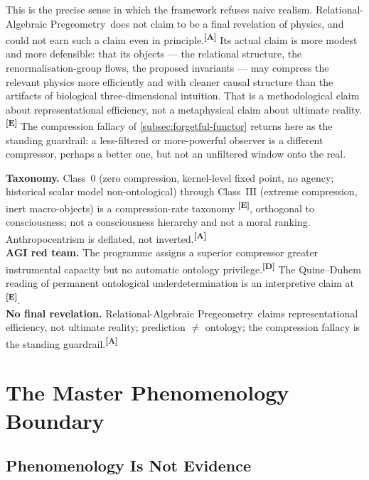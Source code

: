 \documentclass[12pt,a4paper,twoside]{article}
\theoremstyle{plain}
\theoremstyle{definition}
\theoremstyle{remark}
\newcommand{\ProjectShort}{Relational-Algebraic Pregeometry}
\newcommand{\RAP}{\ProjectShort}
\newcommand{\catmark}[1]{\textsuperscript{\textsf{\textbf{[#1]}}}}
\begin{document}
This is the precise sense in which the framework refuses naive realism.
\RAP\ does not claim to be a final revelation of physics, and could not
earn such a claim even in principle.\catmark{A} Its actual claim is more
modest and more defensible: that its objects --- the relational structure,
the renormalisation-group flows, the proposed invariants --- may compress
the relevant physics more efficiently and with cleaner causal structure
than the artifacts of biological three-dimensional intuition. That is a
methodological claim about representational efficiency, not a metaphysical
claim about ultimate reality.\catmark{E} The compression fallacy of
\cref{subsec:forgetful-functor} returns here as the standing guardrail: a
less-filtered or more-powerful observer is a different compressor, perhaps
a better one, but not an unfiltered window onto the real.

\begin{evidencebox}{}
\textbf{Taxonomy.} Class~0 (zero compression, kernel-level fixed point, no
agency; historical scalar model non-ontological) through Class~III (extreme compression, inert
macro-objects) is a compression-rate taxonomy \catmark{E}, orthogonal to
consciousness; not a consciousness hierarchy and not a moral ranking.
Anthropocentrism is deflated, not inverted.\catmark{A}\\[0.3em]
\textbf{AGI red team.} The programme assigns a superior compressor greater
instrumental capacity but no automatic ontology privilege.\catmark{D}
The Quine--Duhem reading of permanent ontological underdetermination is an
interpretive claim at \catmark{E}.\\[0.3em]
\textbf{No final revelation.} \RAP\ claims representational efficiency, not
ultimate reality; prediction $\neq$ ontology; the compression fallacy is
the standing guardrail.\catmark{A}
\end{evidencebox}

\section{The Master Phenomenology Boundary}
\label{sec:phenomenology-boundary}

\subsection{Phenomenology Is Not Evidence}
\label{subsec:phenomenology-not-evidence}
\end{document}
